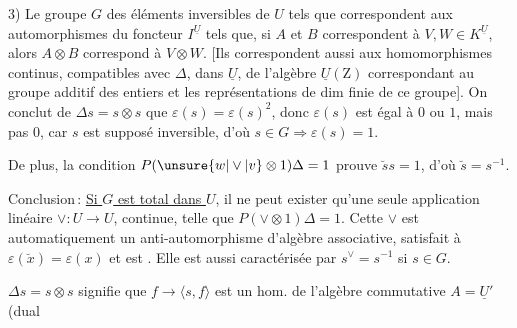 3) Le groupe $G$ des éléments inversibles de $U$
tels que    correspondent aux
automorphismes du foncteur $I^{\underline U}$ tels que,
si $A$ et $B$  correspondent à $V,W\in K^{\underline U}$,
alors $A\otimes B$ correspond à $V\otimes W$. [Ils
correspondent aussi aux homomorphismes
 continus, compatibles avec $\Delta$,
dans $\underline U$, de l'algèbre $\underline U(\mathrm Z)$ correspondant
au groupe additif des entiers et les
représentations  de dim finie
de ce groupe]. On conclut de
$\Delta s=s\otimes s$ que $\varepsilon(s)=\varepsilon(s)^2$, donc $\varepsilon(s)$ est égal
à $0$ ou $1$, mais pas $0$, car $s$ est supposé
inversible, d'où \uline{$s\in G\Longrightarrow\varepsilon(s)=1$}.

De plus, la  condition $P(\unsure{w|\vee|v}\otimes1)\Delta=1$
prouve $\breve s s=1$, d'où \uline{$\breve s=s^{-1}$}.

Conclusion\,: \uline{Si $G$ est total dans $U$}, il
ne peut exister qu'une seule application
 linéaire $\vee:U\longrightarrow U$, continue,
telle que $P(\vee\otimes1)\Delta=1$. Cette $\vee$ est
automatiquement un anti-automorphisme
d'algèbre associative, satisfait à $\varepsilon(\breve x)=\varepsilon(x)$
et est .
Elle est aussi caractérisée par $s^\vee=s^{-1}$
si $s\in G$. 

$\Delta s=s\otimes s$ signifie que $f\longrightarrow\langle s,f\rangle$
 est un hom. de l'algèbre
commutative $A=\underline U'$ (dual

